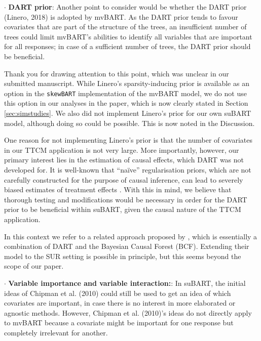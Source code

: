 \documentclass{article}
\begin{document}
\begin{mdframed}
   $\cdot$ \textbf{DART prior}: Another point to consider would be whether the DART prior (Linero, 2018) is adopted by mvBART. As the DART prior tends to favour covariates that are part of the structure of the trees, an insufficient number of trees could limit mvBART's abilities to identify all variables that are important for all responses; in case of a sufficient number of trees, the DART prior should be beneficial.
\end{mdframed}

Thank you for drawing attention to this point, which was unclear in our submitted manuscript. While Linero's sparsity-inducing prior is available as an option in the \texttt{skewBART} implementation of the mvBART model, we do not use this option in our analyses in the paper, which is now clearly stated in Section \ref{sec:simstudies}. We also did not implement Linero's prior for our own suBART model, although doing so could be possible. This is now noted in the Discussion. 

One reason for not implementing  Linero's prior is that the number of covariates in our TTCM application is not very large. More importantly, however, our primary interest lies in the estimation of causal effects, which DART was not developed for. It is well-known that ``na\"{i}ve'' regularisation priors, which are not carefully constructed for the purpose of causal inference, can lead to severely biased estimates of treatment effects \citep{hahn2018regularization, hahn2020bayesian}. With this in mind, we believe that thorough testing and modifications would be necessary in order for the DART prior to be beneficial within suBART, given the causal nature of the TTCM application. 

In this context we refer to a related approach proposed by \citet{caron2022shrinkage}, which is essentially a combination of DART and the Bayesian Causal Forest (BCF). Extending their model to the SUR setting is possible in principle, but this seems beyond the scope of our paper. 

\begin{mdframed}
   $\cdot$ \textbf{Variable importance and variable interaction:}: In suBART, the initial ideas of Chipman et al. (2010) could still be used to get an idea of which covariates are important, in case there is no interest in more elaborated or agnostic methods. However, Chipman et al. (2010)'s ideas do not directly apply to mvBART because a covariate might be important for one response but completely irrelevant for another.
\end{mdframed}
\end{document}
